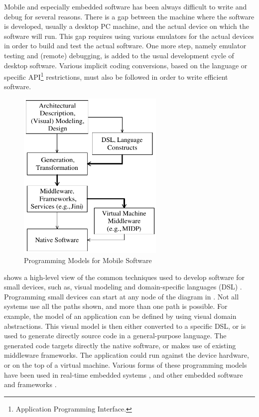 Mobile and especially embedded software has been always difficult to write and debug for several reasons. There is a gap between the machine where the software is developed, usually a desktop PC machine, and the actual device on which the software will run. This gap requires using various emulators for the actual devices in order to build and test the actual software. One more step, namely emulator testing and (remote) debugging, is added to the usual development cycle of desktop software. Various implicit coding conversions, based on the language or specific API\footnote{Application Programming Interface.} restrictions, must also be followed in order to write efficient software.

\begin{figure}[ht]
	\begin{center}
		\includegraphics[width=7cm,height=!]{ch02/pm}
	\end{center}
	\caption{Programming Models for Mobile Software}
	\label{fig:pm}
\end{figure}

 shows a high-level view of the common techniques used to develop software for small devices, such as, visual modeling and domain-specific languages (DSL) \cite{deursenetal.00}. Programming small devices can start at any node of the diagram in . Not all systems use all the paths shown, and more than one path is possible. For example, the model of an application can be defined by using visual domain abstractions. This visual model is then either converted to a specific DSL, or is used to generate directly source code in a general-purpose language. The generated code targets directly the native software, or makes use of existing middleware frameworks. The application could run against the device hardware, or on the top of a virtual machine. Various forms of these programming models have been used in real-time embedded systems \cite{realtime.77,ghosh94survey,emb.gen.02}, and other embedded software and frameworks \cite{BurchPasseroneSangiovanni-Vincentelli2001,emb.comp.03}.

